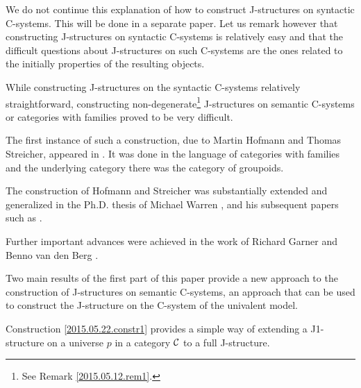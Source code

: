 \documentclass[12pt]{article}
\numberwithin{equation}{section}
\newcommand{\comment}[1]{}
\begin{document}
We do not continue this explanation of how to construct J-structures on
syntactic C-systems. This will be done in a separate paper. Let us remark
however that constructing J-structures on syntactic C-systems is relatively
easy and that the difficult questions about J-structures on such C-systems are
the ones related to the initially properties of the resulting objects.

While constructing J-structures on the syntactic C-systems relatively
straightforward, constructing non-degenerate\footnote{See Remark
  \ref{2015.05.12.rem1}.} J-structures on semantic C-systems or categories with
families proved to be very difficult.

The first instance of such a construction, due to Martin Hofmann and Thomas
Streicher, appeared in \cite{Hofmann1}. It was done in the language of
categories with families and the underlying category there was the category of
groupoids.

The construction of Hofmann and Streicher was substantially extended and
generalized in the Ph.D. thesis of Michael Warren
\cite{WarrenThesisProsp},\cite{WarrenThesis} and his subsequent papers such as
\cite{Warreninfty}.

Further important advances were achieved in the work of Richard Garner and
Benno van den Berg \cite{BergandGarner}.

\comment{However the original expectation that it should be possible to
  construct C-systems or categories with families with J-structures
  corresponding to all Quillen closed model categories with sufficiently good
  properties have not been realized. In particular none of the previous methods
  provided a construction of a C-system whose underlying category is the
  category of simplicial sets and whose J-structure corresponds, in an
  appropriately defined sense, to the standard closed model structure on this
  category.

This goal is still not fully realized in this paper since to achieve it one has
to construct a Kan fibration with certain properties and discussing such a
construction is outside of the scope of this paper. }

Two main results of the first part of this paper provide a new approach to the
construction of J-structures on semantic C-systems, an approach that can be
used to construct the J-structure on the C-system of the univalent model.

Construction \ref{2015.05.22.constr1} provides a simple way of extending a
J1-structure on a universe $p$ in a category $\cal C$ to a full J-structure.
\end{document}
